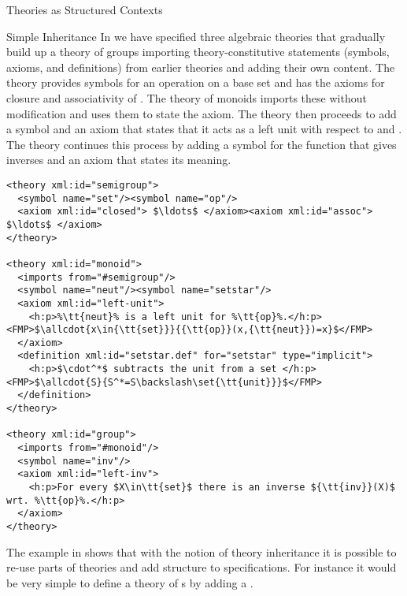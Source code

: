 \begin{omgroup}[short=Mathematical Statements,id=statements]
\begin{omgroup}[id=theories-contexts]{Theories as Structured Contexts}
\begin{module}[id=theories]
\begin{omgroup}[id=inheritance]{Simple Inheritance}
In {} we have specified three algebraic theories that gradually build
up a theory of groups importing theory-constitutive statements (symbols, axioms, and
definitions) from earlier theories and adding their own content. The theory
{} provides symbols for an operation {} on a base set
{} and has the axioms for closure and associativity of
{}. The theory of monoids imports these without modification and uses them
to state the {} axiom. The theory {} then proceeds to
add a symbol {} and an axiom that states that it acts as a left unit with
respect to {} and {}.  The theory {}
continues this process by adding a symbol {} for the function that gives
inverses and an axiom that states its meaning.

\begin{lstlisting}[label=lst:def-group,escapechar=\%,mathescape,
  caption={A Structured Development of Algebraic Theories in \omdoc},
  index={theory,symbol,axiom,imports}]
<theory xml:id="semigroup">
  <symbol name="set"/><symbol name="op"/>
  <axiom xml:id="closed"> $\ldots$ </axiom><axiom xml:id="assoc"> $\ldots$ </axiom>
</theory>

<theory xml:id="monoid">
  <imports from="#semigroup"/>
  <symbol name="neut"/><symbol name="setstar"/>
  <axiom xml:id="left-unit">
    <h:p>%\tt{neut}% is a left unit for %\tt{op}%.</h:p><FMP>$\allcdot{x\in{\tt{set}}}{{\tt{op}}(x,{\tt{neut}})=x}$</FMP>
  </axiom>
  <definition xml:id="setstar.def" for="setstar" type="implicit">
    <h:p>$\cdot^*$ subtracts the unit from a set </h:p><FMP>$\allcdot{S}{S^*=S\backslash\set{\tt{unit}}}$</FMP>
  </definition>
</theory>

<theory xml:id="group"> 
  <imports from="#monoid"/>
  <symbol name="inv"/>
  <axiom xml:id="left-inv">
    <h:p>For every $X\in\tt{set}$ there is an inverse ${\tt{inv}}(X)$ wrt. %\tt{op}%.</h:p>
  </axiom>
</theory>
\end{lstlisting}

The example in {} shows that with the notion of theory inheritance it
is possible to re-use parts of theories and add structure to specifications. For instance
it would be very simple to define a theory of {s} by adding a
{}.


\end{omgroup}
\end{module}
\end{omgroup}
\end{omgroup}
